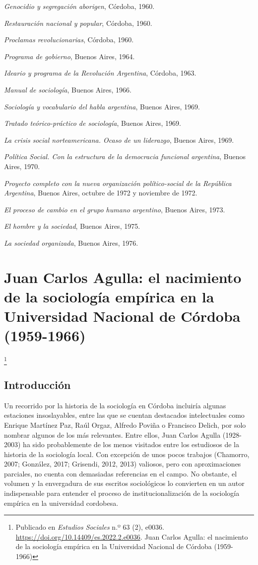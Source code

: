 \emph{Genocidio y segregación aborigen}, Córdoba, 1960.

\emph{Restauración nacional y popular}, Córdoba, 1960.

\emph{Proclamas revolucionarias}, Córdoba, 1960.

\emph{Programa de gobierno}, Buenos Aires, 1964.

\emph{Ideario y programa de la Revolución Argentina}, Córdoba, 1963.

\emph{Manual de sociología}, Buenos Aires, 1966.

\emph{Sociología y vocabulario del habla argentina}, Buenos Aires, 1969.

\emph{Tratado teórico-práctico de sociología}, Buenos Aires, 1969.

\emph{La crisis social norteamericana. Ocaso de un liderazgo}, Buenos Aires, 1969.

\emph{Política Social. Con la estructura de la democracia funcional argentina}, Buenos Aires, 1970.

\emph{Proyecto completo con la nueva organización político-social de la República Argentina}, Buenos Aires, octubre de 1972 y noviembre de 1972.

\emph{El proceso de cambio en el grupo humano argentino}, Buenos Aires, 1973.

\emph{El hombre y la sociedad}, Buenos Aires, 1975.

\emph{La sociedad organizada}, Buenos Aires, 1976.


\chapter{Juan Carlos Agulla: el nacimiento de la sociología empírica en la Universidad Nacional de Córdoba (1959-1966)}

\footnote{Publicado en \emph{Estudios Sociales} n.º 63 (2), e0036. \url{https://doi.org/10.14409/es.2022.2.e0036}. Juan Carlos Agulla: el nacimiento de la sociología empírica en la Universidad Nacional de Córdoba (1959-1966)}

\section{Introducción}

Un recorrido por la historia de la sociología en Córdoba incluiría algunas estaciones insoslayables, entre las que se cuentan destacados intelectuales como Enrique Martínez Paz, Raúl Orgaz, Alfredo Poviña o Francisco Delich, por solo nombrar algunos de los más relevantes. Entre ellos, Juan Carlos Agulla (1928-2003) ha sido probablemente de los menos visitados entre los estudiosos de la historia de la sociología local. Con excepción de unos pocos trabajos \parencite{1447-CARACCIOLO2010}(Chamorro, 2007; González, 2017; Grisendi, 2012, 2013) valiosos, pero con aproximaciones parciales, no cuenta con demasiadas referencias en el campo. No obstante, el volumen y la envergadura de sus escritos sociológicos lo convierten en un autor indispensable para entender el proceso de institucionalización de la sociología empírica en la universidad cordobesa.

